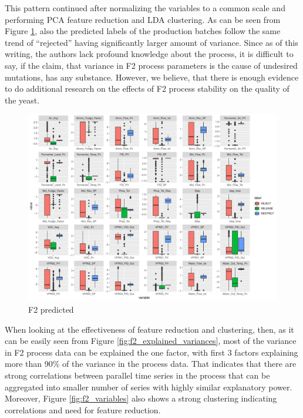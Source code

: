 This pattern continued after normalizing the variables to a common scale and performing PCA feature reduction and LDA clustering. As can be seen from Figure \ref{fig:f2_predicted}, also the predicted labels of the production batches follow the same trend of ``rejected'' having significantly larger amount of variance. Since as of this writing, the authors lack profound knowledge about the process, it is difficult to say, if the claim, that variance in F2 process parameters is the cause of undesired mutations, has any substance. However, we believe, that there is enough evidence to do additional research on the effects of F2 process stability on the quality of the yeast.

\begin{figure}[ht]
    \centering
    \includegraphics[width=1.0\textwidth]{plots/f2-predicted.pdf}
    \caption{F2 predicted}
    \label{fig:f2_predicted}
\end{figure}

When looking at the effectiveness of feature reduction and clustering, then, as it can be easily seen from Figure \ref{fig:f2_explained_variances}, most of the variance in F2 process data can be explained the one factor, with first 3 factors explaining more than 90\% of the variance in the process data. That indicates that there are strong correlations between parallel time series in the process that can be aggregated into smaller number of series with highly similar explanatory power. Moreover, Figure \ref{fig:f2_variables} also shows a strong clustering indicating correlations and need for feature reduction.

